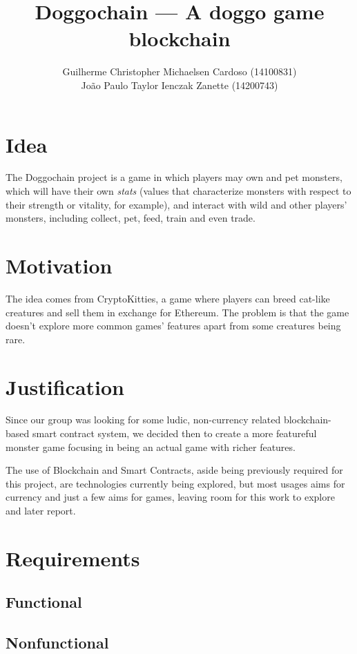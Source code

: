 \documentclass{article}
\title{Doggochain --- A doggo game blockchain}
\author{%
    Guilherme Christopher Michaelsen Cardoso (14100831) \\
    João Paulo Taylor Ienczak Zanette (14200743)
}
\begin{document}
    \maketitle

    \section{Idea}

    The Doggochain project is a game in which players may own and pet monsters,
    which will have their own \textit{stats} (values that characterize monsters
    with respect to their strength or vitality, for example), and interact with
    wild and other players' monsters, including collect, pet, feed, train and
    even trade.

    \section{Motivation}

    The idea comes from CryptoKitties, a game where players can breed cat-like
    creatures and sell them in exchange for Ethereum. The problem is that the
    game doesn't explore more common games' features apart from some creatures
    being rare.

    \section{Justification}

    Since our group was looking for some ludic, non-currency related
    blockchain-based smart contract system, we decided then to create a more
    featureful monster game focusing in being an actual game with richer
    features.

    The use of Blockchain and Smart Contracts, aside being previously required
    for this project, are technologies currently being explored, but most
    usages aims for currency and just a few aims for games, leaving room for
    this work to explore and later report.

    \section{Requirements}

    \subsection{Functional}

    \subsection{Nonfunctional}
\end{document}
